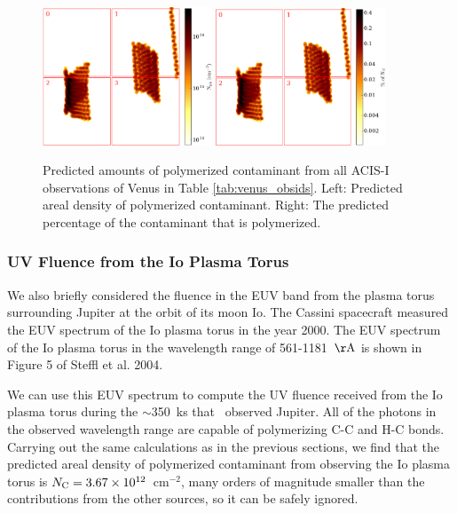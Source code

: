 \documentclass[11pt]{article}
\begin{document}
\begin{figure}
\begin{center}
\includegraphics[width=0.45\textwidth]{venus_all_fluence.eps}
\includegraphics[width=0.45\textwidth]{venus_all_fluence_percent.eps}
\caption{Predicted amounts of polymerized contaminant from all ACIS-I observations of Venus in Table \ref{tab:venus_obsids}.
Left: Predicted areal density of polymerized contaminant. Right: The predicted percentage of the contaminant that is
polymerized.\label{fig:total_venus_fluence}}
\end{center}
\end{figure}

\subsubsection{UV Fluence from the Io Plasma Torus}\label{sec:io_torus}

We also briefly considered the fluence in the EUV band from the plasma torus surrounding Jupiter at the orbit of
its moon Io. The Cassini spacecraft measured the EUV spectrum of the Io plasma torus in the year 2000. The EUV spectrum
of the Io plasma torus in the wavelength range of 561-1181~$\rm{\AA}$ is shown in Figure 5 of Steffl et al. 2004.

We can use this EUV spectrum to compute the UV fluence received from the Io plasma torus during the $\sim$350~ks that
\chandra~observed Jupiter. All of the photons in the observed wavelength range are capable of polymerizing C-C and H-C
bonds. Carrying out the same calculations as in the previous sections, we find that the predicted areal density of
polymerized contaminant from observing the Io plasma torus is $N_{\rm C} = 3.67 \times 10^{12}$~cm$^{-2}$, many orders
of magnitude smaller than the contributions from the other sources, so it can be safely ignored.
\end{document}

